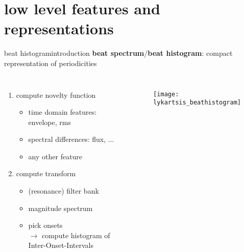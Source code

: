         \section[features]{low level features and representations}
            \begin{frame}{beat histogram}{introduction}
                \vspace{-3mm}
                \textbf{beat spectrum}/\textbf{beat histogram}: compact representation of periodicities
                \begin{columns}[T]
                        \begin{enumerate}
                            \item<2->   compute novelty function
                                \begin{itemize}
                                    \item   time domain features: envelope, rms
                                    \item   spectral differences: flux, ...
                                    \item   any other feature
                                \end{itemize}
                            \item<3->   compute transform
                                \begin{itemize}
                                    \item   (resonance) filter bank
                                    \item   magnitude spectrum
                                    \item   pick onsets\\ $\rightarrow$ compute histogram of Inter-Onset-Intervals 
                                \end{itemize}
                        \end{enumerate}
                        \begin{figure}
                            \centering
                                \texttt{[image: lykartsis\_beathistogram]}
                        \end{figure}
                \end{columns}
                
            \end{frame}
